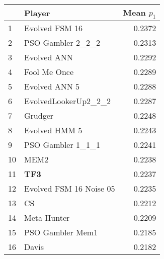 \begin{tabular}{llr}
\toprule
{} &                   Player &  Mean $p_1$ \\
\midrule
1  &           Evolved FSM 16 &      0.2372 \\
2  &        PSO Gambler 2\_2\_2 &      0.2313 \\
3  &              Evolved ANN &      0.2292 \\
4  &             Fool Me Once &      0.2289 \\
5  &            Evolved ANN 5 &      0.2288 \\
6  &     EvolvedLookerUp2\_2\_2 &      0.2287 \\
7  &                  Grudger &      0.2248 \\
8  &            Evolved HMM 5 &      0.2243 \\
9  &        PSO Gambler 1\_1\_1 &      0.2241 \\
10 &                     MEM2 &      0.2238 \\
11 &                      \textbf{TF3} &      0.2237 \\
12 &  Evolved FSM 16 Noise 05 &      0.2235 \\
13 &                       CS &      0.2212 \\
14 &              Meta Hunter &      0.2209 \\
15 &         PSO Gambler Mem1 &      0.2185 \\
16 &                    Davis &      0.2182 \\
\bottomrule
\end{tabular}
